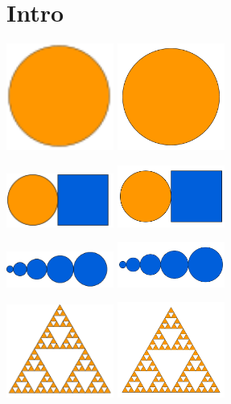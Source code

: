 \documentclass{article}%
\begin{document}
%


\section{Intro}


\includegraphics[width=100pt]{examples/output/intro-01.png}
\includegraphics[width=100pt]{examples/output/intro-01.pdf}

\includegraphics[width=100pt]{examples/output/intro-02.png}
\includegraphics[width=100pt]{examples/output/intro-02.pdf}


\includegraphics[width=100pt]{examples/output/intro-03.png}
\includegraphics[width=100pt]{examples/output/intro-03.pdf}


\includegraphics[width=100pt]{examples/output/intro-04.png}
\includegraphics[width=100pt]{examples/output/intro-04.pdf}
\end{document}
